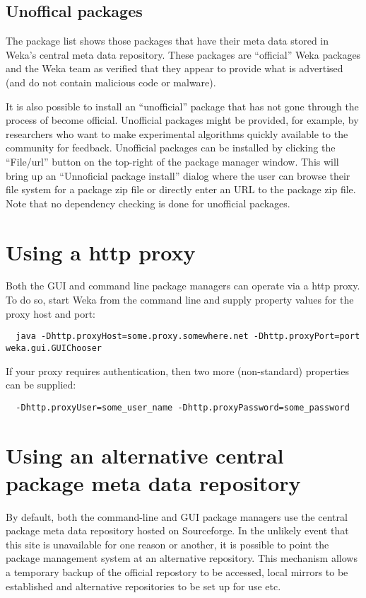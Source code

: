 \subsection{Unoffical packages}

The package list shows those packages that have their meta data stored in 
Weka's central meta data repository. These packages are ``official'' Weka 
packages and the Weka team as verified that they appear to provide what is 
advertised (and do not contain malicious code or malware).

It is also possible to install an ``unofficial'' package that has not
gone through the process of become official. Unofficial packages might
be provided, for example, by researchers who want to make experimental
algorithms quickly available to the community for feedback. Unofficial
packages can be installed by clicking the ``File/url'' button on the
top-right of the package manager window. This will bring up an
``Unnoficial package install'' dialog where the user can browse their
file system for a package zip file or directly enter an URL to the
package zip file. Note that no dependency checking is done for
unofficial packages.

\section{Using a http proxy}

Both the GUI and command line package managers can operate via a http proxy. To do so,
start Weka from the command line and supply property values for the proxy host and port:

{\scriptsize
\begin{verbatim}
  java -Dhttp.proxyHost=some.proxy.somewhere.net -Dhttp.proxyPort=port weka.gui.GUIChooser
\end{verbatim}}

If your proxy requires authentication, then two more (non-standard) properties can be
supplied:

{\scriptsize
\begin{verbatim}
  -Dhttp.proxyUser=some_user_name -Dhttp.proxyPassword=some_password
\end{verbatim}}

\section{Using an alternative central package meta data repository}

By default, both the command-line and GUI package managers use the
central package meta data repository hosted on Sourceforge. In the
unlikely event that this site is unavailable for one reason or
another, it is possible to point the package management system at an
alternative repository. This mechanism allows a temporary backup of
the official repostory to be accessed, local mirrors to be established
and alternative repositories to be set up for use etc.

